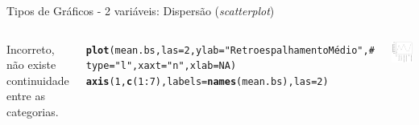 \documentclass{beamer}\usepackage[]{graphicx}\usepackage[]{color}
\makeatletter
\newcommand{\hlnum}[1]{\textcolor[rgb]{0.686,0.059,0.569}{#1}}%
\newcommand{\hlstr}[1]{\textcolor[rgb]{0.192,0.494,0.8}{#1}}%
\newcommand{\hlcom}[1]{\textcolor[rgb]{0.678,0.584,0.686}{\textit{#1}}}%
\newcommand{\hlopt}[1]{\textcolor[rgb]{0,0,0}{#1}}%
\newcommand{\hlstd}[1]{\textcolor[rgb]{0.345,0.345,0.345}{#1}}%
\newcommand{\hlkwc}[1]{\textcolor[rgb]{0.333,0.667,0.333}{#1}}%
\newcommand{\hlkwd}[1]{\textcolor[rgb]{0.737,0.353,0.396}{\textbf{#1}}}%
\newenvironment{kframe}{%
 \def\at@end@of@kframe{}%
 \ifinner\ifhmode%
  \def\at@end@of@kframe{\end{minipage}}%
  \begin{minipage}{\columnwidth}%
 \fi\fi%
 \def\FrameCommand##1{\hskip\@totalleftmargin \hskip-\fboxsep
 \colorbox{shadecolor}{##1}\hskip-\fboxsep
     \hskip-\linewidth \hskip-\@totalleftmargin \hskip\columnwidth}%
 \MakeFramed {\advance\hsize-\width
   \@totalleftmargin\z@ \linewidth\hsize
   \@setminipage}}%
 {\par\unskip\endMakeFramed%
 \at@end@of@kframe}
\newenvironment{knitrout}{}{} %
\renewenvironment{knitrout}{\setlength{\topsep}{0mm}}{}
\makeatother
\begin{document}
\begin{frame}[fragile]{Tipos de Gráficos - 2 variáveis: Dispersão (\emph{scatterplot})}

\begin{columns}[t]


Incorreto, não existe continuidade entre as categorias.
\vfill

\begin{knitrout}\tiny
{}\color{fgcolor}\begin{kframe}
\begin{alltt}
\hlkwd{plot}\hlstd{(mean.bs,}\hlkwc{las}\hlstd{=}\hlnum{2}\hlstd{,}\hlkwc{ylab}\hlstd{=}\hlstr{"Retroespalhamento Médio"}\hlstd{,}\hlcom{#}
     \hlkwc{type}\hlstd{=}\hlstr{"l"}\hlstd{,}\hlkwc{xaxt}\hlstd{=}\hlstr{"n"}\hlstd{,}\hlkwc{xlab}\hlstd{=}\hlnum{NA}\hlstd{)}
\hlkwd{axis}\hlstd{(}\hlnum{1}\hlstd{,}\hlkwd{c}\hlstd{(}\hlnum{1}\hlopt{:}\hlnum{7}\hlstd{),}\hlkwc{labels}\hlstd{=}\hlkwd{names}\hlstd{(mean.bs),}\hlkwc{las}\hlstd{=}\hlnum{2}\hlstd{)}
\end{alltt}
\end{kframe}
\end{knitrout}


\begin{knitrout}
\color{fgcolor}
\includegraphics[width=1\linewidth]{figure/unnamed-chunk-61-1} 

\end{knitrout}

\end{columns}

\end{frame}
\end{document}
